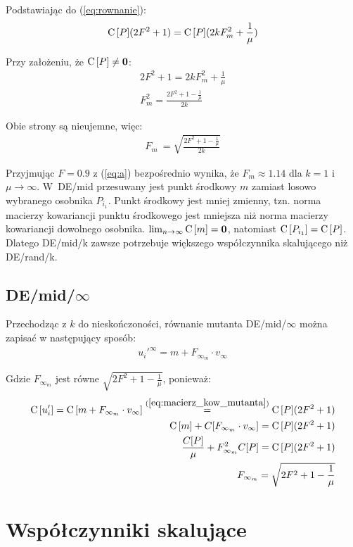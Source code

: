 \documentclass[a4paper,onecolumn,oneside,12pt,wide,floatssmall]{mwrep}
\def\C{{\rm C}\,}
\theoremstyle{definition}
\theoremstyle{plain}%
\theoremstyle{remark}
\begin{document}
Podstawiając do (\ref{eq:rownanie}):
\begin{align*}
\C[P](2F^2 + 1) = \C[P](2kF_m^2 + \frac{1}{\mu})
\end{align*}

Przy założeniu, że $\C[P] \neq \textbf{0}$:
\begin{align*}
2F^2 + 1 = 2kF_m^2 + \frac{1}{\mu} \\
F_m^2 = \frac{2F^2 + 1 - \frac{1}{\mu}}{2k}
\end{align*}

Obie strony są nieujemne, więc:
\begin{align} \label{eq:a}
F_m\ = \sqrt{\frac{2F^2 + 1 - \frac{1}{\mu}}{2k}}
\end{align}

Przyjmując $F=0.9$ z (\ref{eq:a}) bezpośrednio wynika, że $F_m \approx 1.14$ dla $k=1$ i $\mu\to\infty$.
W~DE/mid przesuwany jest punkt środkowy $m$ zamiast losowo wybranego osobnika $P_{i_1}$.
Punkt środkowy jest mniej zmienny, 
tzn. norma macierzy kowariancji punktu środkowego jest mniejsza niż norma macierzy kowariancji dowolnego osobnika.
$\lim_{n\to\infty} \C[m] = \textbf{0}$, natomiast $\C[P_{i_1}] = \C[P]$.
Dlatego DE/mid/k zawsze potrzebuje większego współczynnika skalującego niż DE/rand/k.

\subsection{DE/mid/$\infty$}

Przechodząc z $k$ do nieskończoności, równanie mutanta DE/mid/$\infty$ można zapisać
w następujący sposób:
\begin{align*}
u_i'^\infty = m + F_{\infty_m} \cdot v_\infty
\end{align*}

Gdzie $F_{\infty_m}$ jest równe $\sqrt{2F^2 + 1 - \frac{1}{\mu}}$, ponieważ:
\begin{align*}
\C[u_i'] = \C[m + F_{\infty_m} \cdot v_\infty] \overset{(\ref{eq:macierz_kow_mutanta})}{=} \C[P](2F^2 + 1) \\
\C[m] + C[F_{\infty_m} \cdot v_\infty] = \C[P](2F^2 + 1) \\
\frac{C[P]}{\mu} + F_{\infty_m}^2 C[P] = \C[P](2F^2 + 1) \\
F_{\infty_m} = \sqrt{2F^2 + 1 - \frac{1}{\mu}}
\end{align*}

\section{Współczynniki skalujące}
\end{document}

